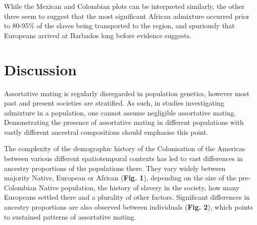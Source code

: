\documentclass[11pt]{article}
\begin{document}
While the Mexican and Colombian plots can be interpreted similarly, the other three seem to suggest that the most significant African admixture occurred prior to 80-95\% of the slaves being transported to the region, and spuriously that Europeans arrived at Barbados long before evidence suggests. 







\vspace{8mm}
\section{Discussion}





Assortative mating is regularly disregarded in population genetics, however most past and present societies are stratified. As such, in studies investigating admixture in a population, one cannot assume negligible assortative mating. Demonstrating the presence of assortative mating in different populations with vastly different ancestral compositions should emphasise this point. 

The complexity of the demographic history of the Colonisation of the Americas between various different spatiotemporal contexts has led to vast differences in ancestry proportions of the populations there. They vary widely between majority Native, European or African  (\textbf{Fig. 1}), depending on the size of the pre-Colombian Native population, the history of slavery in the society, how many Europeans settled there and a plurality of other factors. Significant differences in ancestry proportions are also observed between individuals (\textbf{Fig. 2}), which points to sustained patterns of assortative mating.
\end{document}
